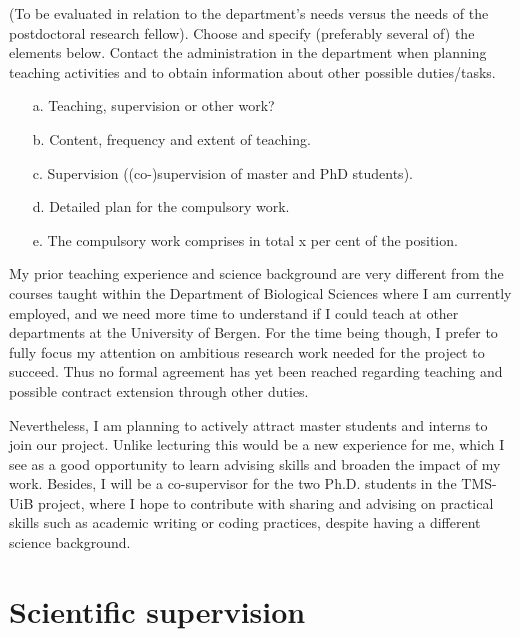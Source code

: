 \documentclass{article}
\newcommand{\guideline}[1]{{\color{color2}\itshape{#1}}}
\begin{document}
    \guideline{
        (To be evaluated in relation to the department’s needs versus the needs
        of the postdoctoral research fellow). Choose and specify (preferably
        several of) the elements below. Contact the administration in the
        department when planning teaching activities and to obtain information
        about other possible duties/tasks.

        \begin{itemize}
          \item[a.] Teaching, supervision or other work?
          \item[b.] Content, frequency and extent of teaching.
          \item[c.] Supervision ((co-)supervision of master and PhD students).
          \item[d.] Detailed plan for the compulsory work.
          \item[e.] The compulsory work comprises in total x per cent of the position.
        \end{itemize}}

    My prior teaching experience and science background are very different from
    the courses taught within the Department of Biological Sciences where I am
    currently employed, and we need more time to understand if I could teach
    at other departments at the University of Bergen. For the time being
    though, I prefer to fully focus my attention on ambitious research work
    needed for the project to succeed. Thus no formal agreement
    has yet been reached regarding teaching and possible contract extension
    through other duties.

    Nevertheless,
    I am planning to actively attract master students and interns to join our
    project. Unlike lecturing this would be a new experience for me, which I
    see as a good opportunity to learn advising skills and broaden the impact
    of my work. Besides, I will be a co-supervisor for the two Ph.D. students
    in the TMS-UiB project, where I hope to contribute with sharing and
    advising on practical skills such as academic writing or coding practices,
    despite having a different science background.


\section{Scientific supervision}
\end{document}
